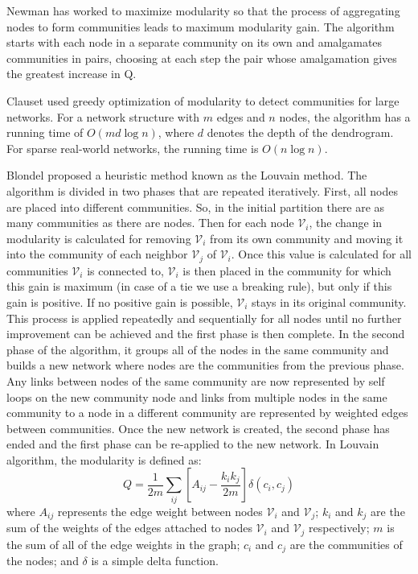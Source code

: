 \documentclass[\main/thesis.tex]{subfiles}
\begin{document}
Newman \cite{newman2004fast} has worked to maximize modularity so that the process of aggregating nodes to form communities leads to maximum modularity gain. The algorithm starts with each node in a separate community on its own and amalgamates communities in pairs, choosing at each step the pair whose amalgamation gives the greatest increase in Q.

Clauset \cite{clauset2004finding} used greedy optimization of modularity to detect communities for large networks. For a network structure with $m$ edges and $n$ nodes, the algorithm has a running time of $O(md \log n)$, where $d$ denotes the depth of the dendrogram. For sparse real-world networks, the running time is $O(n\log n)$.

Blondel \cite{blondel2008fast} proposed a heuristic method known as the Louvain method. The algorithm is divided in two phases that are repeated iteratively. First, all nodes are placed into different communities. So, in the initial partition there are as many communities as there are nodes. Then for each node $\mathcal{V}_i$, the change in modularity is calculated for removing $\mathcal{V}_i$ from its own community and moving it into the community of each neighbor $\mathcal{V}_j$ of $\mathcal{V}_i$. Once this value is calculated for all communities $\mathcal{V}_i$ is connected to, $\mathcal{V}_i$ is then placed in the community for which this gain is maximum (in case of a tie we use a breaking rule), but only if this gain is positive. If no positive gain is possible, $\mathcal{V}_i$ stays in its original community. This process is applied repeatedly and sequentially for all nodes until no further improvement can be achieved and the first phase is then complete. In the second phase of the algorithm, it groups all of the nodes in the same community and builds a new network where nodes are the communities from the previous phase. Any links between nodes of the same community are now represented by self loops on the new community node and links from multiple nodes in the same community to a node in a different community are represented by weighted edges between communities. Once the new network is created, the second phase has ended and the first phase can be re-applied to the new network. In Louvain algorithm, the modularity is defined as: 
\begin{equation}
Q=\frac{1}{2m}\sum_{ij}[A_{ij}-\frac{k_ik_j}{2m}]\delta(c_i,c_j)
\end{equation}
where $A_{ij}$ represents the edge weight between nodes $\mathcal{V}_i$ and $\mathcal{V}_j$; $k_{i}$ and $k_j$ are the sum of the weights of the edges attached to nodes $\mathcal{V}_i$ and $\mathcal{V}_j$ respectively; $m$ is the sum of all of the edge weights in the graph; $c_{i}$ and $c_{j}$ are the communities of the nodes; and $\delta$ is a simple delta function.
\end{document}
